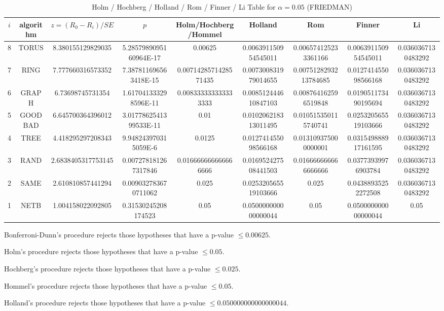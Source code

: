 \documentclass[a4paper,10pt]{article}
\begin{document}
\begin{landscape}
\begin{table}[!htp]
\begin{tabular}{
|r|r|r|r|r|r|r|r|r|r|}
\end{tabular}
\end{table}

\newpage

\begin{table}[!htp]
\centering\scriptsize
\caption{Holm / Hochberg / Holland / Rom / Finner / Li Table for $\alpha=0.05$ (FRIEDMAN)}
\begin{tabular}{ccccccccc}
$i$&algorithm&$z=(R_0 - R_i)/SE$&$p$&Holm/Hochberg/Hommel&Holland&Rom&Finner&Li\\
\hline
8& TORUS&8.380155129829035&5.2857989095160964E-17&0.00625&0.006391150954545011&0.006574125233361166&0.006391150954545011&0.0360367130483292\\
7& RING&7.777660316573352&7.387811696563418E-15&0.0071428571428571435&0.007300831979014655&0.0075128293213784685&0.012741455098566168&0.0360367130483292\\
6& GRAPH&6.73698745731354&1.617041333298596E-11&0.008333333333333333&0.008512444610847103&0.008764162596519848&0.019051173490195694&0.0360367130483292\\
5& GOODBAD&6.645700364396012&3.0177862541399533E-11&0.01&0.010206218313011495&0.010515350115740741&0.025320565519103666&0.0360367130483292\\
4& TREE&4.418295297208343&9.948243970315059E-6&0.0125&0.012741455098566168&0.013109375000000001&0.031549888917161595&0.0360367130483292\\
3& RAND&2.6838405317753145&0.007278181267317846&0.016666666666666666&0.016952427508441503&0.016666666666666666&0.03773939976903784&0.0360367130483292\\
2& SAME&2.610810857441294&0.009032783670711062&0.025&0.025320565519103666&0.025&0.04388935252272508&0.0360367130483292\\
1& NETB&1.004158022092805&0.31530245208174523&0.05&0.050000000000000044&0.05&0.050000000000000044&0.05\\
\hline
\end{tabular}
\end{table}
Bonferroni-Dunn's procedure rejects those hypotheses that have a p-value $\le0.00625$.


Holm's procedure rejects those hypotheses that have a p-value $\le0.05$.


Hochberg's procedure rejects those hypotheses that have a p-value $\le0.025$.


Hommel's procedure rejects those hypotheses that have a p-value $\le0.05$.


Holland's procedure rejects those hypotheses that have a p-value $\le0.050000000000000044$.



\end{landscape}
\end{document}
